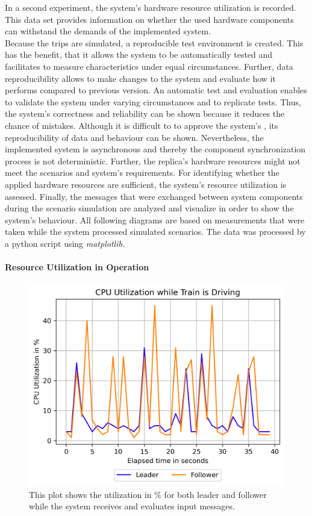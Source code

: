 In a second experiment, the system's hardware resource utilization is recorded.
This data set provides information on whether the used hardware components can withstand the demands of the implemented system.
\\

Because the trips are simulated, a reproducible test environment is created.
This has the benefit, that it allows the system to be automatically tested and facilitates to measure characteristics under equal circumstances.
Further, data reproducibility allows to make changes to the system and evaluate how it performs compared to previous version.
An automatic test and evaluation enables to validate the system under varying circumstances and to replicate tests.
Thus, the system's correctness and reliability can be shown because it reduces the chance of mistakes.
Although it is difficult to to approve the system's , its reproducibility of data and behaviour can be shown.
Nevertheless, the implemented system is asynchronous and thereby the component synchronization process is not deterministic.
Further, the replica's hardware resources might not meet the scenarios and system's requirements.
For identifying whether the applied hardware resources are sufficient, the system's resource utilization is assessed.
Finally, the messages that were exchanged between system components during the scenario simulation are analyzed and visualize in order to show the system's behaviour.
All following diagrams are based on measurements that were taken while the system processed simulated scenarios.
The data was processed by a python script using \textit{matplotlib}.

\paragraph{Resource Utilization in Operation}

\begin{figure}[!hb]
	\centering
	\includegraphics[width=0.75\linewidth]{images/plots/CPUUsage}
	\caption{This plot shows the  utilization in \% for both leader and follower while the system receives and evaluates input messages.}
	\label{fig:PlotCPUUsage}
\end{figure}

